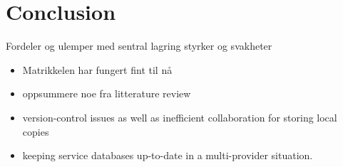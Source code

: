 \chapter{Conclusion}

Fordeler og ulemper med sentral lagring styrker og svakheter


\begin{itemize}
	\item Matrikkelen har fungert fint til nå
	\item oppsummere noe fra litterature review
	\item version-control issues as well as inefficient collaboration for storing local copies
	\item keeping service databases up-to-date in a multi-provider situation. %
	
\end{itemize}










